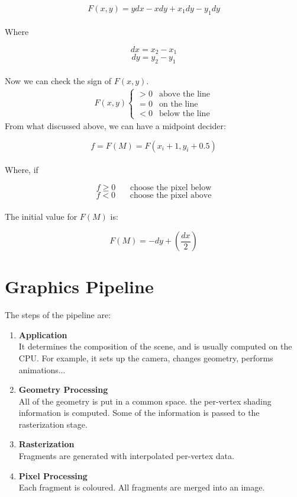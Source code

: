 \documentclass{article}
\begin{document}
\[ F(x,y) = ydx - xdy + x_1dy - y_1dy \] \\
Where

\[ dx = x_2 - x_1 \]
\[ dy = y_2 - y_1 \] \\
Now we can check the sign of $F(x,y)$.
\begin{align*}
	F(x, y) \begin{cases} > 0 & \text{above the line} \\ = 0 & \text{on the line} \\ < 0 & \text{below the line} \end{cases}
\end{align*}
From what discussed above, we can have a midpoint decider:

\[ f = F(M) = F(x_i + 1, y_i + 0.5) \] \\
Where, if

\[ f \geq 0 ~~~~~~~~ \text{choose the pixel below} \]
\[ f < 0 ~~~~~~~~ \text{choose the pixel above} \] \\
The initial value for $F(M)$ is:

\[ F(M) = -dy + \left(\frac{dx}{2}\right) \]

\section{Graphics Pipeline}
The steps of the pipeline are:

\begin{enumerate}
	\item \textbf{Application}
	\vspace{.2cm} \\
	It determines the composition of the scene, and is usually computed on the CPU. For example, it sets up the camera, changes geometry, performs animations...
	
	\item \textbf{Geometry Processing}
	\vspace{.2cm} \\
	All of the geometry is put in a common space. the per-vertex shading information is computed. Some of the information is passed to the rasterization stage.
	
	\item \textbf{Rasterization}
	\vspace{.2cm} \\
	Fragments are generated with interpolated per-vertex data.
	
	\item \textbf{Pixel Processing}
	\vspace{.2cm} \\
	Each fragment is coloured. All fragments are merged into an image.
\end{enumerate}
\end{document}
